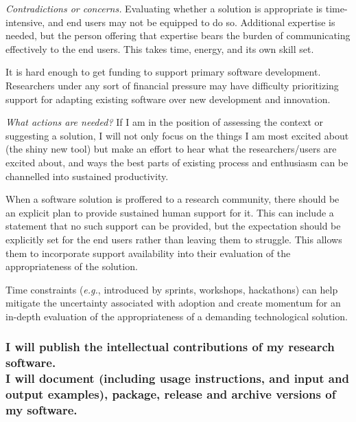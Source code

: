 \documentclass[a4paper,UKenglish]{dagman}
\renewcommand{\paragraph}[1]{\subsubsection*{#1}\xspace}
\newcommand{\eg}{\emph{e.g.},\xspace}
\begin{document}
\emph{Contradictions or concerns.}
Evaluating whether a solution is appropriate is time-intensive, and end users may not be equipped to do so. Additional expertise is needed, but the person offering that expertise bears the burden of communicating effectively to the end users. This takes time, energy, and its own skill set.

It is hard enough to get funding to support primary software development. Researchers under any sort of financial pressure may have difficulty prioritizing support for adapting existing software over new development and innovation.

\emph{What actions are needed?}
If I am in the position of assessing the context or suggesting a solution, I will not only focus on the things I am most excited about (the shiny new tool) but make an effort to hear what the researchers/users are excited about, and ways the best parts of existing process and enthusiasm can be channelled into sustained productivity.

When a software solution is proffered to a research community, there should be an explicit plan to provide sustained human support for it. This can include a statement that no such support can be provided, but the expectation should be explicitly set for the end users rather than leaving them to struggle. This allows them to incorporate support availability into their evaluation of the appropriateness of the solution.


Time constraints (\eg introduced by sprints, workshops, hackathons) can help mitigate the uncertainty associated with adoption and create momentum for an in-depth evaluation of the appropriateness of a demanding technological solution.

\paragraph{I will publish the intellectual contributions of my research software. \\ I will document (including usage instructions, and input and output examples), package, release and archive versions of my software.}
\end{document}
